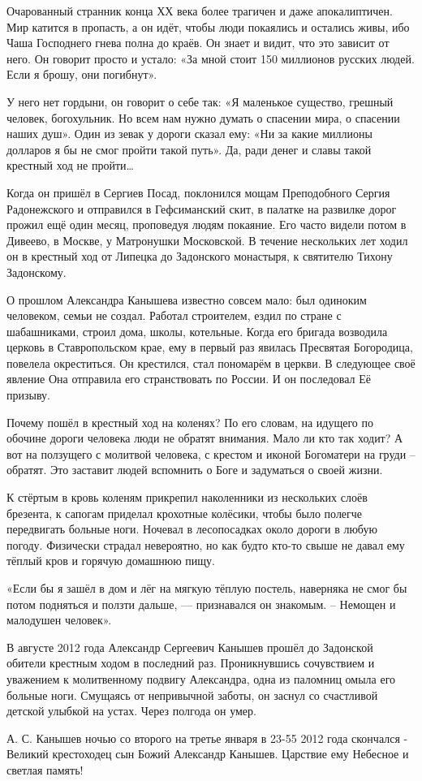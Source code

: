 Очарованный странник конца ХХ века более трагичен и даже апокалиптичен. Мир
катится в пропасть, а он идёт, чтобы люди покаялись и остались живы, ибо Чаша
Господнего гнева полна до краёв. Он знает и видит, что это зависит от него. Он
говорит просто и устало: «За мной стоит 150 миллионов русских людей. Если я
брошу, они погибнут».

У него нет гордыни, он говорит о себе так: «Я маленькое существо, грешный
человек, богохульник. Но всем нам нужно думать о спасении мира, о спасении
наших душ». Один из зевак у дороги сказал ему: «Ни за какие миллионы долларов я
бы не смог пройти такой путь». Да, ради денег и славы такой крестный ход не
пройти…

Когда он пришёл в Сергиев Посад, поклонился мощам Преподобного Сергия
Радонежского и отправился в Гефсиманский скит, в палатке на развилке дорог
прожил ещё один месяц, проповедуя людям покаяние. Его часто видели потом в
Дивеево, в Москве, у Матронушки Московской. В течение нескольких лет ходил он в
крестный ход от Липецка до Задонского монастыря, к святителю Тихону Задонскому.

О прошлом Александра Канышева известно совсем мало: был одиноким человеком,
семьи не создал. Работал строителем, ездил по стране с шабашниками, строил
дома, школы, котельные. Когда его бригада возводила церковь в Ставропольском
крае, ему в первый раз явилась Пресвятая Богородица, повелела окреститься. Он
крестился, стал пономарём в церкви. В следующее своё явление Она отправила его
странствовать по России. И он последовал Её призыву.

Почему пошёл в крестный ход на коленях? По его словам, на идущего по обочине
дороги человека люди не обратят внимания. Мало ли кто так ходит? А вот на
ползущего с молитвой человека, с крестом и иконой Богоматери на груди –
обратят. Это заставит людей вспомнить о Боге и задуматься о своей жизни.

К стёртым в кровь коленям прикрепил наколенники из нескольких слоёв брезента, к
сапогам приделал крохотные колёсики, чтобы было полегче передвигать больные
ноги. Ночевал в лесопосадках около дороги в любую погоду. Физически страдал
невероятно, но как будто кто-то свыше не давал ему тёплый кров и горячую
домашнюю пищу.

«Если бы я зашёл в дом и лёг на мягкую тёплую постель, наверняка не смог бы
потом подняться и ползти дальше, — признавался он знакомым. – Немощен и
малодушен человек».

В августе 2012 года Александр Сергеевич Канышев прошёл до Задонской обители
крестным ходом в последний раз. Проникнувшись сочувствием и уважением к
молитвенному подвигу Александра, одна из паломниц омыла его больные ноги.
Смущаясь от непривычной заботы, он заснул со счастливой детской улыбкой на
устах. Через полгода он умер.

А. С. Канышев ночью со второго на третье января в 23-55 2012 года скончался -
Великий крестоходец сын Божий Александр Канышев. Царствие ему Небесное и
светлая память!

